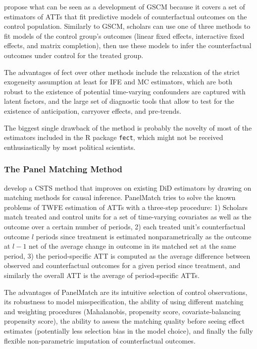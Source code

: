 \documentclass[hidelinks]{article}\usepackage[]{graphicx}\usepackage[]{color}
\begin{document}
\textcite{Liu} propose what can be seen as a development of GSCM because it covers a set of estimators of ATTs that fit predictive models of counterfactual outcomes on the control population. Similarly to GSCM, scholars can use one of three methods to fit models of the control group's outcomes (linear fixed effects, interactive fixed effects, and matrix completion), then use these models to infer the counterfactual outcomes under control for the treated group. 

The advantages of fect over other methods include the relaxation of the strict exogeneity assumption at least for IFE and MC estimators, which are both robust to the existence of potential time-varying confounders are captured with latent factors, and the large set of diagnostic tools that allow to test for the existence of anticipation, carryover effects, and pre-trends.

The biggest single drawback of the method is probably the novelty of most of the estimators included in the R package \texttt{fect}, which might not be received enthusiastically by most political scientists.


\subsubsection{The Panel Matching Method}

\textcite{Imai2021} develop a CSTS method that improves on existing DiD estimators by drawing on matching methods for causal inference. PanelMatch tries to solve the known problems of TWFE estimation of ATTs with a three-step procedure: 1) Scholars match treated and control units for a set of time-varying covariates as well as the outcome over a certain number of periods, 2) each treated unit's counterfactual outcome $l$ periods since treatment is estimated nonparametrically as the outcome at $l-1$ net of the average change in outcome in its matched set at the same period, 3) the period-specific ATT is computed as the average difference between observed and counterfactual outcomes for a given period since treatment, and similarly the overall ATT is the average of period-specific ATTs.

The advantages of PanelMatch are its intuitive selection of control observations, its robustness to model misspecification, the ability of using different matching and weighting procedures (Mahalanobis, propensity score, covariate-balancing propensity score), the ability to assess the matching quality before seeing effect estimates (potentially less selection bias in the model choice), and finally the fully flexible non-parametric imputation of counterfactual outcomes.
\end{document}
